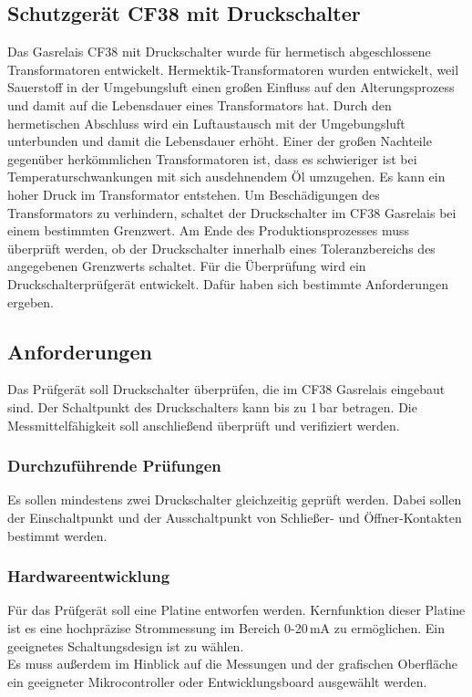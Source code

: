 \subsection{Schutzgerät CF38 mit Druckschalter}
Das Gasrelais CF38 mit Druckschalter wurde für hermetisch abgeschlossene Transformatoren entwickelt.
Hermektik-Transformatoren wurden entwickelt, weil Sauerstoff in der Umgebungsluft einen großen Einfluss
auf den Alterungsprozess und damit auf die Lebensdauer eines Transformators hat. Durch den hermetischen
Abschluss wird ein Luftaustausch mit der Umgebungsluft unterbunden und damit die Lebensdauer erhöht.
Einer der großen Nachteile gegenüber herkömmlichen Transformatoren ist,
dass es schwieriger ist bei Temperaturschwankungen mit sich ausdehnendem Öl umzugehen.
Es kann ein hoher Druck im Transformator entstehen. Um Beschädigungen des Transformators
zu verhindern, schaltet der Druckschalter im CF38 Gasrelais bei einem bestimmten Grenzwert.
Am Ende des Produktionsprozesses muss überprüft werden, ob der Druckschalter innerhalb eines
Toleranzbereichs des angegebenen Grenzwerts schaltet.
Für die Überprüfung wird ein Druckschalterprüfgerät entwickelt. Dafür haben sich bestimmte Anforderungen ergeben.

\subsection{Anforderungen}
Das Prüfgerät soll Druckschalter überprüfen, die im CF38 Gasrelais eingebaut sind.
Der Schaltpunkt des Druckschalters kann bis zu 1\,bar betragen. Die Messmittelfähigkeit
soll anschließend überprüft und verifiziert werden.

\subsubsection{Durchzuführende Prüfungen}
Es sollen mindestens zwei Druckschalter gleichzeitig geprüft werden. Dabei sollen der Einschaltpunkt
und der Ausschaltpunkt von Schließer- und Öffner-Kontakten bestimmt werden.

\subsubsection{Hardwareentwicklung}
Für das Prüfgerät soll eine Platine entworfen werden. Kernfunktion dieser Platine ist es eine hochpräzise
Strommessung im Bereich 0-20\,mA zu ermöglichen. Ein geeignetes Schaltungsdesign ist zu wählen.
\\
Es muss außerdem im Hinblick auf die Messungen und der grafischen Oberfläche ein geeigneter Mikrocontroller
oder Entwicklungsboard ausgewählt werden.

